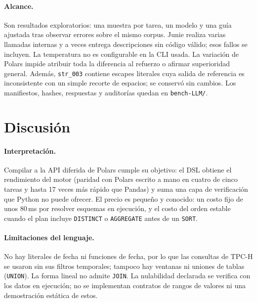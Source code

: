 \documentclass[sigplan,screen,nonacm]{acmart}
\begin{document}
\paragraph{Alcance.} Son resultados exploratorios: una muestra por tarea, un modelo
y una guía ajustada tras observar errores sobre el mismo corpus. Junie realiza
varias llamadas internas y a veces entrega descripciones sin código válido; esos
fallos se incluyen. La temperatura no es configurable en la CLI usada. La variación
de Polars impide atribuir toda la diferencia al refuerzo o afirmar superioridad
general. Además, \texttt{str\_003} contiene escapes literales cuya salida de referencia
es inconsistente con un simple recorte de espacios; se conservó sin cambios.
Los manifiestos, hashes, respuestas y auditorías quedan en \texttt{bench-LLM/}.

\clearpage
\nobalance
\section{Discusión}
\label{sec:discusion}

\paragraph{Interpretación.} Compilar a la API diferida de Polars cumple su objetivo: el DSL
obtiene el rendimiento del motor (paridad con Polars escrito a mano en cuatro de cinco tareas
y hasta 17 veces más rápido que Pandas) y suma una capa de verificación que Python no puede
ofrecer. El precio es pequeño y conocido: un costo fijo de unos 80\,ms por resolver esquemas
en ejecución, y el costo del orden estable cuando el plan incluye \texttt{DISTINCT} o
\texttt{AGGREGATE} antes de un \texttt{SORT}.

\paragraph{Limitaciones del lenguaje.} No hay literales de fecha ni funciones de fecha, por
lo que las consultas de TPC-H se usaron sin sus filtros temporales; tampoco hay ventanas ni
uniones de tablas (\texttt{UNION}). La forma lineal no admite \texttt{JOIN}. La nulabilidad declarada se verifica con los datos en ejecución; no se implementan
contratos de rangos de valores ni una demostración estática de estos.
\end{document}
